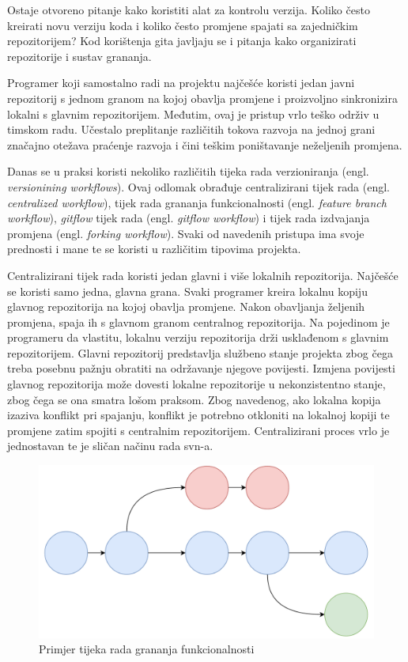 \documentclass[times, utf8, diplomski, numeric]{fer}
\newcommand{\eng}[1]{(engl. \textit{#1})}
\begin{document}
Ostaje otvoreno pitanje kako koristiti alat za kontrolu verzija. Koliko često kreirati novu verziju koda i koliko često promjene spajati sa zajedničkim repozitorijem? Kod korištenja gita javljaju se i pitanja kako organizirati repozitorije i sustav grananja.

Programer koji samostalno radi na projektu najčešće koristi jedan javni repozitorij s jednom granom na kojoj obavlja promjene i proizvoljno sinkronizira lokalni s glavnim repozitorijem. Međutim, ovaj je pristup vrlo teško održiv u timskom radu. Učestalo preplitanje različitih tokova razvoja na jednoj grani značajno otežava praćenje razvoja i čini teškim poništavanje neželjenih promjena.

Danas se u praksi koristi nekoliko različitih tijeka rada verzioniranja \eng{versionining workflows}. Ovaj odlomak obrađuje centralizirani tijek rada \eng{centralized workflow}, tijek rada grananja funkcionalnosti \eng{feature branch workflow}, \textit{gitflow} tijek rada \eng{gitflow workflow} i tijek rada izdvajanja promjena \eng{forking workflow}. Svaki od navedenih pristupa ima svoje prednosti i mane te se koristi u različitim tipovima projekta\citep{versioningWorkflows}.

Centralizirani tijek rada koristi jedan glavni i više lokalnih repozitorija. Najčešće se koristi samo jedna, glavna grana. Svaki programer kreira lokalnu kopiju glavnog repozitorija na kojoj obavlja promjene. Nakon obavljanja željenih promjena, spaja ih s glavnom granom centralnog repozitorija. Na pojedinom je programeru da vlastitu, lokalnu verziju repozitorija drži usklađenom s glavnim repozitorijem. Glavni repozitorij predstavlja službeno stanje projekta zbog čega treba posebnu pažnju obratiti na održavanje njegove povijesti. Izmjena povijesti glavnog repozitorija može dovesti lokalne repozitorije u nekonzistentno stanje, zbog čega se ona smatra lošom praksom. Zbog navedenog, ako lokalna kopija izaziva konflikt pri spajanju, konflikt je potrebno otkloniti na lokalnoj kopiji te promjene zatim spojiti s centralnim repozitorijem. Centralizirani proces vrlo je jednostavan te je sličan načinu rada svn-a.

\begin{figure}
\centering
\includegraphics[scale=0.5]{FeatureBranch}
\caption{Primjer tijeka rada grananja funkcionalnosti}
\label{fig:FeatureBranch}
\end{figure}
\end{document}
